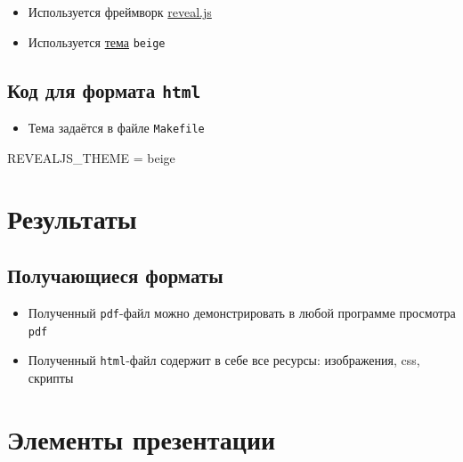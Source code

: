 \documentclass[
  letterpaper,
  DIV=11,
  numbers=noendperiod]{scrartcl}
\newenvironment{Shaded}{\begin{snugshade}}{\end{snugshade}}
\newcommand{\NormalTok}[1]{\textcolor[rgb]{0.00,0.23,0.31}{#1}}
\providecommand{\tightlist}{%
  \setlength{\itemsep}{0pt}\setlength{\parskip}{0pt}}\usepackage{longtable,booktabs,array}
\begin{document}
\begin{itemize}
\tightlist
\item
  Используется фреймворк \href{https://revealjs.com/}{reveal.js}
\item
  Используется \href{https://revealjs.com/themes/}{тема} \texttt{beige}
\end{itemize}

\subsection{\texorpdfstring{Код для формата
\texttt{html}}{Код для формата html}}\label{ux43aux43eux434-ux434ux43bux44f-ux444ux43eux440ux43cux430ux442ux430-html}

\begin{itemize}
\tightlist
\item
  Тема задаётся в файле \texttt{Makefile}
\end{itemize}

\begin{Shaded}
\begin{Highlighting}[]
\NormalTok{REVEALJS\_THEME = beige}
\end{Highlighting}
\end{Shaded}

\section{Результаты}\label{ux440ux435ux437ux443ux43bux44cux442ux430ux442ux44b}

\subsection{Получающиеся
форматы}\label{ux43fux43eux43bux443ux447ux430ux44eux449ux438ux435ux441ux44f-ux444ux43eux440ux43cux430ux442ux44b}

\begin{itemize}
\tightlist
\item
  Полученный \texttt{pdf}-файл можно демонстрировать в любой программе
  просмотра \texttt{pdf}
\item
  Полученный \texttt{html}-файл содержит в себе все ресурсы:
  изображения, css, скрипты
\end{itemize}

\section{Элементы
презентации}\label{ux44dux43bux435ux43cux435ux43dux442ux44b-ux43fux440ux435ux437ux435ux43dux442ux430ux446ux438ux438}
\end{document}
